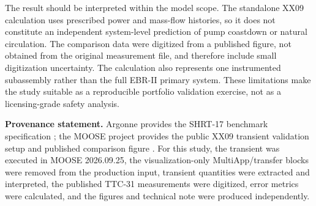 \documentclass[10pt,a4paper]{article}
\begin{document}
The result should be interpreted within the model scope. The standalone XX09 calculation uses prescribed power and mass-flow histories, so it does not constitute an independent system-level prediction of pump coastdown or natural circulation. The comparison data were digitized from a published figure, not obtained from the original measurement file, and therefore include small digitization uncertainty. The calculation also represents one instrumented subassembly rather than the full EBR-II primary system. These limitations make the study suitable as a reproducible portfolio validation exercise, not as a licensing-grade safety analysis.

\vspace{1mm}
{\small\textbf{Provenance statement.} Argonne provides the SHRT-17 benchmark specification \parencite{sumner2012}; the MOOSE project provides the public XX09 transient validation setup and published comparison figure \parencite{moose_ebrii}. For this study, the transient was executed in MOOSE 2026.09.25, the visualization-only MultiApp/transfer blocks were removed from the production input, transient quantities were extracted and interpreted, the published TTC-31 measurements were digitized, error metrics were calculated, and the figures and technical note were produced independently.}

\printbibliography[title={References}]
\end{document}
